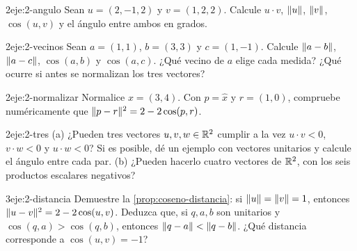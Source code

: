 \begin{ejercicio}{2}{eje:2-angulo}
Sean $u=(2,-1,2)$ y $v=(1,2,2)$. Calcule $u\cdot v$, $\lVert u\rVert$, $\lVert v\rVert$, $\cos(u,v)$ y el ángulo entre ambos en grados.
\end{ejercicio}

\begin{ejercicio}{2}{eje:2-vecinos}
Sean $a=(1,1)$, $b=(3,3)$ y $c=(1,-1)$. Calcule $\lVert a-b\rVert$, $\lVert a-c\rVert$, $\cos(a,b)$ y $\cos(a,c)$. ¿Qué vecino de $a$ elige cada medida? ¿Qué ocurre si antes se normalizan los tres vectores?
\end{ejercicio}

\begin{ejercicio}{2}{eje:2-normalizar}
Normalice $x=(3,4)$. Con $p=\hat x$ y $r=(1,0)$, compruebe numéricamente que $\lVert p-r\rVert^{2}=2-2\cos(p,r)$.
\end{ejercicio}

\begin{ejercicio}{2}{eje:2-tres}
(a) ¿Pueden tres vectores $u,v,w\in\mathbb{R}^{2}$ cumplir a la vez $u\cdot v<0$, $v\cdot w<0$ y $u\cdot w<0$? Si es posible, dé un ejemplo con vectores unitarios y calcule el ángulo entre cada par. (b) ¿Pueden hacerlo cuatro vectores de $\mathbb{R}^{2}$, con los seis productos escalares negativos?
\end{ejercicio}

\begin{ejercicio}{3}{eje:2-distancia}
Demuestre la \cref{prop:coseno-distancia}: si $\lVert u\rVert=\lVert v\rVert=1$, entonces $\lVert u-v\rVert^{2}=2-2\cos(u,v)$. Deduzca que, si $q,a,b$ son unitarios y $\cos(q,a)>\cos(q,b)$, entonces $\lVert q-a\rVert<\lVert q-b\rVert$. ¿Qué distancia corresponde a $\cos(u,v)=-1$?
\end{ejercicio}
